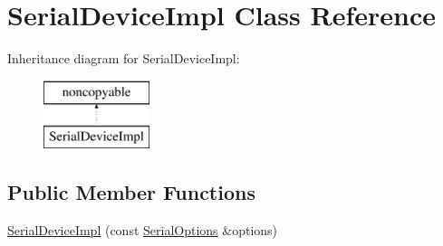 \hypertarget{class_serial_device_impl}{\section{Serial\-Device\-Impl Class Reference}
\label{class_serial_device_impl}
}
Inheritance diagram for Serial\-Device\-Impl\-:\begin{figure}[H]
\begin{center}
\leavevmode
\includegraphics[height=2.000000cm]{class_serial_device_impl}
\end{center}
\end{figure}
\subsection*{Public Member Functions}
\begin{DoxyCompactItemize}
\item 
\hyperlink{class_serial_device_impl_a27356900b57e08fdb21222e6a80b0af3}{Serial\-Device\-Impl} (const \hyperlink{class_serial_options}{Serial\-Options} \&options)
\end{DoxyCompactItemize}
